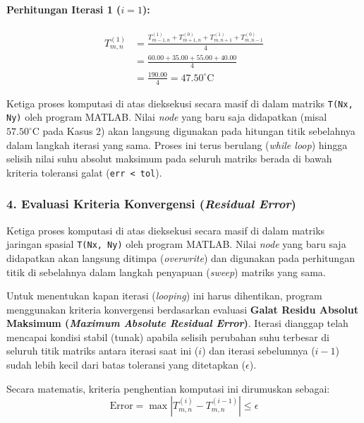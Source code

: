 \documentclass[12pt,a4paper]{article}
\begin{document}
\paragraph{Perhitungan Iterasi 1 ($i = 1$):}
\begin{align*}
T_{m,n}^{(1)}
    &= \frac{T_{m-1,n}^{(1)} + T_{m+1,n}^{(0)} + T_{m,n+1}^{(1)} + T_{m,n-1}^{(0)}}{4} \\[4pt]
    &= \frac{60.00 + 35.00 + 55.00 + 40.00}{4} \\[4pt]
    &= \frac{190.00}{4} = \boxed{47.50^\circ\text{C}}
\end{align*}

\vspace{0.3cm}
Ketiga proses komputasi di atas dieksekusi secara masif di dalam matriks \texttt{T(Nx, Ny)} oleh program MATLAB. Nilai \textit{node} yang baru saja didapatkan (misal $57.50^\circ\text{C}$ pada Kasus 2) akan langsung digunakan pada hitungan titik sebelahnya dalam langkah iterasi yang sama. Proses ini terus berulang (\textit{while loop}) hingga selisih nilai suhu absolut maksimum pada seluruh matriks berada di bawah kriteria toleransi galat (\texttt{err < tol}).

\subsubsection*{4. Evaluasi Kriteria Konvergensi (\textit{Residual Error})}
Ketiga proses komputasi di atas dieksekusi secara masif di dalam matriks jaringan spasial \texttt{T(Nx, Ny)} oleh program MATLAB. Nilai \textit{node} yang baru saja didapatkan akan langsung ditimpa (\textit{overwrite}) dan digunakan pada perhitungan titik di sebelahnya dalam langkah penyapuan (\textit{sweep}) matriks yang sama.

Untuk menentukan kapan iterasi (\textit{looping}) ini harus dihentikan, program menggunakan kriteria konvergensi berdasarkan evaluasi \textbf{Galat Residu Absolut Maksimum (\textit{Maximum Absolute Residual Error})}. Iterasi dianggap telah mencapai kondisi stabil (tunak) apabila selisih perubahan suhu terbesar di seluruh titik matriks antara iterasi saat ini ($i$) dan iterasi sebelumnya ($i-1$) sudah lebih kecil dari batas toleransi yang ditetapkan ($\epsilon$).

Secara matematis, kriteria penghentian komputasi ini dirumuskan sebagai:
\begin{equation} \label{eq:error}
    \text{Error} = \max \left| T_{m,n}^{(i)} - T_{m,n}^{(i-1)} \right| \leq \epsilon
\end{equation}
\end{document}
